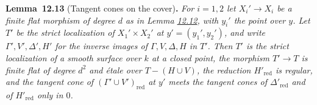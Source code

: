 \documentclass[11pt]{article}
\newenvironment{bpstatement}[2]{\par\addvspace{0.6\baselineskip}\noindent\textbf{#1}#2\textbf{.}\enspace\ignorespaces}
  {\par\addvspace{0.4\baselineskip}}
\newenvironment{bpstatementit}[2]{\begin{bpstatement}{#1}{#2}\itshape\ignorespaces}{\end{bpstatement}}
\begin{document}
\label{bp40}%
\begin{bpstatementit}{Lemma~12.13}{ (Tangent cones on the cover)}
For \(i=1,2\) let \(X_i'\to X_i\) be a finite flat morphism of degree \(d\) as in Lemma \hyperref[bp38]{12.12}, with \(y_i'\) the point over \(y\). Let \(T'\) be the strict localization of \(X_1'\times X_2'\) at \(y'=(y_1',y_2')\), and write \(\Gamma',V',\Delta',H'\) for the inverse images of \(\Gamma,V,\Delta,H\) in \(T'\). Then \(T'\) is the strict localization of a smooth surface over \(k\) at a closed point, the morphism \(T'\to T\) is finite flat of degree \(d^2\) and étale over \(T-(H\cup V)\), the reduction \(H'_{\mathrm{red}}\) is regular, and the tangent cone of \((\Gamma'\cup V')_{\mathrm{red}}\) at \(y'\) meets the tangent cones of \(\Delta'_{\mathrm{red}}\) and of \(H'_{\mathrm{red}}\) only in \(0\).
\end{bpstatementit}
\end{document}
